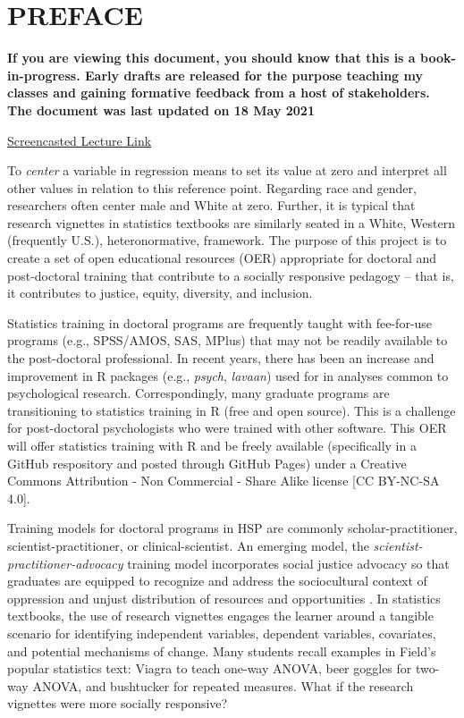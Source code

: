 \documentclass[
  english,
]{book}
\begin{document}
\hypertarget{preface}{%
\chapter*{PREFACE}\label{preface}}

\textbf{If you are viewing this document, you should know that this is a book-in-progress. Early drafts are released for the purpose teaching my classes and gaining formative feedback from a host of stakeholders. The document was last updated on 18 May 2021}

\href{https://spu.hosted.panopto.com/Panopto/Pages/Viewer.aspx?id=c932455e-ef06-444a-bdca-acf7012d759a}{Screencasted Lecture Link}

To \emph{center} a variable in regression means to set its value at zero and interpret all other values in relation to this reference point. Regarding race and gender, researchers often center male and White at zero. Further, it is typical that research vignettes in statistics textbooks are similarly seated in a White, Western (frequently U.S.), heteronormative, framework. The purpose of this project is to create a set of open educational resources (OER) appropriate for doctoral and post-doctoral training that contribute to a socially responsive pedagogy -- that is, it contributes to justice, equity, diversity, and inclusion.

Statistics training in doctoral programs are frequently taught with fee-for-use programs (e.g., SPSS/AMOS, SAS, MPlus) that may not be readily available to the post-doctoral professional. In recent years, there has been an increase and improvement in R packages (e.g., \emph{psych}, \emph{lavaan}) used for in analyses common to psychological research. Correspondingly, many graduate programs are transitioning to statistics training in R (free and open source). This is a challenge for post-doctoral psychologists who were trained with other software. This OER will offer statistics training with R and be freely available (specifically in a GitHub respository and posted through GitHub Pages) under a Creative Commons Attribution - Non Commercial - Share Alike license {[}CC BY-NC-SA 4.0{]}.

Training models for doctoral programs in HSP are commonly scholar-practitioner, scientist-practitioner, or clinical-scientist. An emerging model, the \emph{scientist-practitioner-advocacy} training model incorporates social justice advocacy so that graduates are equipped to recognize and address the sociocultural context of oppression and unjust distribution of resources and opportunities \citep{mallinckrodt_scientist-practitioner-advocate_2014}. In statistics textbooks, the use of research vignettes engages the learner around a tangible scenario for identifying independent variables, dependent variables, covariates, and potential mechanisms of change. Many students recall examples in Field's \citeyearpar{field_discovering_2012} popular statistics text: Viagra to teach one-way ANOVA, beer goggles for two-way ANOVA, and bushtucker for repeated measures. What if the research vignettes were more socially responsive?
\end{document}
